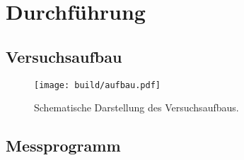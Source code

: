\section{Durchführung}%
\label{sec:durchfuehrung}

\subsection{Versuchsaufbau}%
\label{sub:versuchsaufbau}

\begin{figure}[ht]
  \centering
  \texttt{[image: build/aufbau.pdf]}
  \caption{Schematische Darstellung des Versuchsaufbaus. \cite{anleitung}}
  \label{fig:aufbau}
\end{figure}

\subsection{Messprogramm}%
\label{sub:messprogramm}
